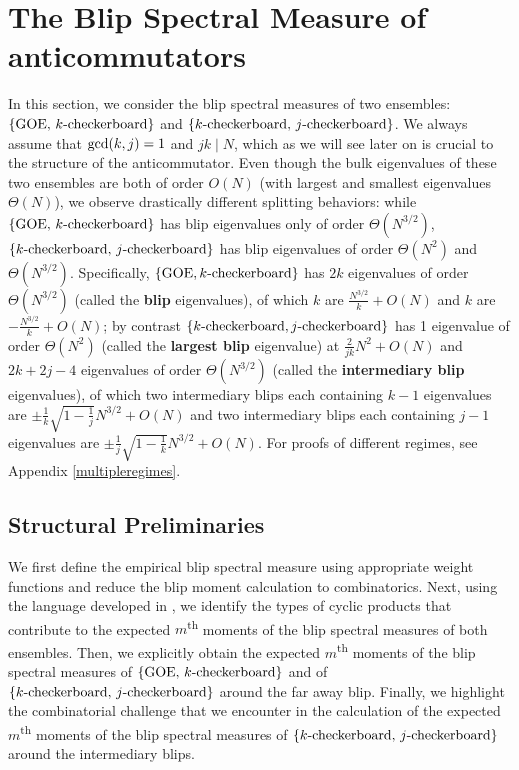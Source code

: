 \documentclass[11pt,reqno]{amsart}
\numberwithin{equation}{section}
\theoremstyle{plain}
\begin{document}
\section{The Blip Spectral Measure of anticommutators}
In this section, we consider the blip spectral measures of two ensembles: $\{\textup{GOE, }k\textup{-checkerboard}\}$ and $\{k\textup{-checkerboard, }j\textup{-checkerboard}\}$. We always assume that $\textup{gcd}(k, j)=1$ and $jk\mid N$, which as we will see later on is crucial to the structure of the anticommutator. Even though the bulk eigenvalues of these two ensembles are both of order $O(N)$ (with largest and smallest eigenvalues $\Theta(N)$), we observe drastically different splitting behaviors: while $\{\textup{GOE, }k\textup{-checkerboard}\}$ has blip eigenvalues only of order $\Theta(N^{3/2})$, $\{k\textup{-checkerboard, }j\textup{-checkerboard}\}$ has blip eigenvalues of order $\Theta(N^2)$ and $\Theta(N^{3/2})$. Specifically, $\{\textup{GOE}, k\textup{-checkerboard}\}$ has $2k$ eigenvalues of order $\Theta(N^{3/2})$ (called the \textbf{blip} eigenvalues), of which $k$ are $\frac{N^{3/2}}{k}+O(N)$ and $k$ are $-\frac{N^{3/2}}{k}+O(N)$; by contrast $\{k\textup{-checkerboard}, j\textup{-checkerboard}\}$ has 1 eigenvalue of order $\Theta(N^2)$ (called the \textbf{largest blip} eigenvalue) at $\frac{2}{jk}N^2+O(N)$ and $2k+2j-4$ eigenvalues of order $\Theta(N^{3/2})$ (called the \textbf{intermediary blip} eigenvalues), of which two intermediary blips each containing $k-1$ eigenvalues are $\pm \frac{1}{k}\sqrt{1-\frac{1}{j}}N^{3/2}+O(N)$ and two intermediary blips each containing $j-1$ eigenvalues are $\pm\frac{1}{j}\sqrt{1-\frac{1}{k}}N^{3/2}+O(N)$. For proofs of different regimes, see Appendix \ref{multipleregimes}.

\subsection{Structural Preliminaries}

We first define the empirical blip spectral measure using appropriate weight functions and reduce the blip moment calculation to combinatorics. Next, using the language developed in \cite{split}, we identify the types of cyclic products that contribute to the expected $m$\textsuperscript{th} moments of the blip spectral measures of both ensembles. Then, we explicitly obtain the expected $m$\textsuperscript{th} moments of the blip spectral measures of $\{\textup{GOE, }k\textup{-checkerboard}\}$ and of $\{k\textup{-checkerboard, }j\textup{-checkerboard}\}$ around the far away blip. Finally, we highlight the combinatorial challenge that we encounter in the calculation of the expected $m$\textsuperscript{th} moments of the blip spectral measures of $\{k\textup{-checkerboard, }j\textup{-checkerboard}\}$ around the intermediary blips.
\end{document}
